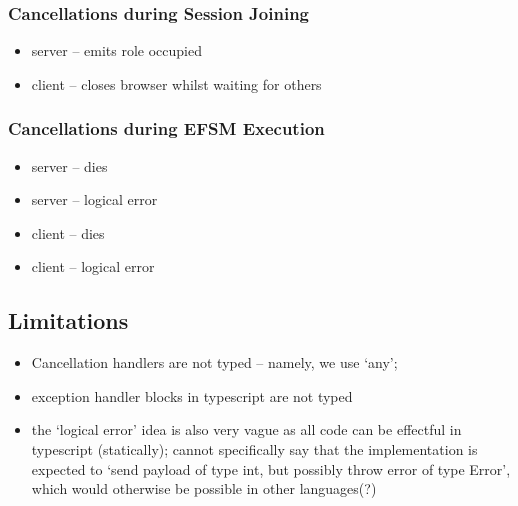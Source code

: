 \subsubsection{Cancellations during Session Joining}

\begin{itemize}
\item server -- emits role occupied
\item client -- closes browser whilst waiting for others
\end{itemize}

\subsubsection{Cancellations during EFSM Execution}

\begin{itemize}
\item server -- dies
\item server -- logical error
\item client -- dies
\item client -- logical error
\end{itemize}

\subsection{Limitations}
\begin{itemize}
\item Cancellation handlers are not typed -- namely, we use `any';
\item exception handler blocks in typescript are not typed
\item the `logical error' idea is also very vague as all code can be effectful in typescript (statically); cannot specifically say that the implementation is expected to `send payload of type int, but possibly throw error of type Error', which would otherwise be possible in other languages(?)
\end{itemize}